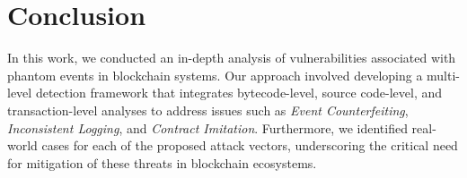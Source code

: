 \section{Conclusion}

In this work, we conducted an in-depth analysis of vulnerabilities associated with phantom events in blockchain systems. Our approach involved developing a multi-level detection framework that integrates bytecode-level, source code-level, and transaction-level analyses to address issues such as \emph{Event Counterfeiting}, \emph{Inconsistent Logging}, and \emph{Contract Imitation}. Furthermore, we identified real-world cases for each of the proposed attack vectors, underscoring the critical need for mitigation of these threats in blockchain ecosystems.